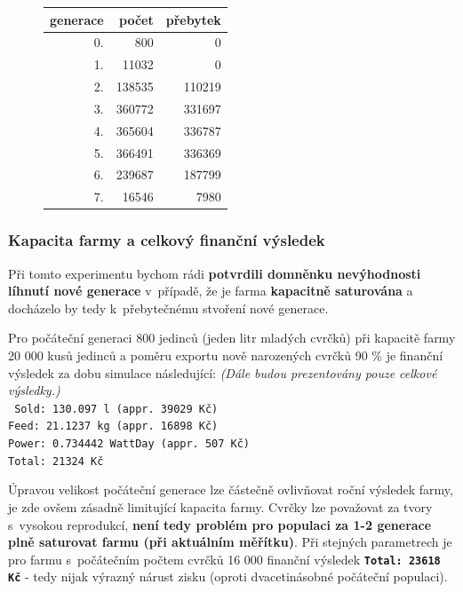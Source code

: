 \documentclass[11pt, a4paper, titlepage]{article}
\begin{document}
\begin{figure}[H]
\begin{minipage}{.48\textwidth}
\begin{center}
\begin{table}[H]
                    \begin{tabular}{|r|r|r|}
                        \hline
                        generace & počet & přebytek \\
                        \hline
                        0. & 800 & 0 \\
                        1. & 11032 & 0 \\
                        2. & 138535 & 110219 \\
                        3. & 360772 & 331697 \\
                        4. & 365604 & 336787 \\
                        5. & 366491 & 336369 \\
                        6. & 239687 & 187799 \\
                        7. & 16546 & 7980 \\
                        \hline
                    \end{tabular}
                \end{table}
            \end{center}
        \end{minipage}
    \end{figure}
    \vspace{-20pt}
    \subsubsection{Kapacita farmy a celkový finanční výsledek}
    Při tomto experimentu bychom rádi \textbf{potvrdili domněnku nevýhodnosti líhnutí nové generace} v~případě, že je farma
    \textbf{kapacitně saturována} a docházelo by tedy k~přebytečnému stvoření nové generace.

    Pro počáteční generaci 800 jedinců (jeden litr mladých cvrčků) při kapacitě farmy 20 000 kusů jedinců a poměru exportu nově narozených cvrčků 90 \%
    je finanční výsledek za dobu simulace následující: \textit{(Dále budou prezentovány pouze celkové výsledky.)} \\
    \texttt{
    Sold: 130.097 l (appr. 39029 Kč)\\
    Feed: 21.1237 kg (appr. 16898 Kč)\\
    Power: 0.734442 WattDay (appr. 507 Kč)\\
    Total: 21324 Kč\\
    }

    Úpravou velikost počáteční generace lze částečně ovlivňovat roční výsledek farmy, je zde ovšem zásadně limitující
    kapacita farmy. Cvrčky lze považovat za tvory s~vysokou reprodukcí, \textbf{není tedy problém pro populaci za 1-2
    generace plně saturovat farmu (při aktuálním měřítku)}. Při stejných parametrech je pro farmu s~počátečním počtem
    cvrčků 16 000 finanční výsledek \textbf{\texttt{Total: 23618 Kč}} - tedy nijak výrazný nárust zisku (oproti dvacetinásobné
    počáteční populaci).
\end{document}
